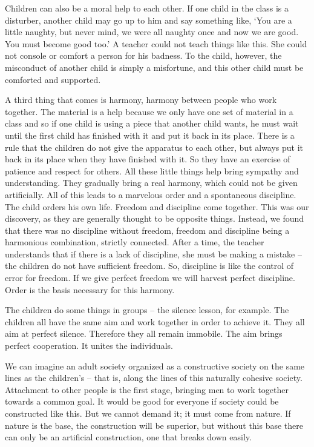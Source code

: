 \documentclass[lang=cn,10pt]{elegantbook}
\begin{document}
Children can also be a moral help to each other. If one child in the class is a disturber, another child may go up to him and say something like, ‘You are a little naughty, but never mind, we were all naughty once and now we are good. You must become good too.’ A teacher could not teach things like this. She could not console or comfort a person for his badness. To the child, however, the misconduct of another child is simply a misfortune, and this other child must be comforted and supported.

A third thing that comes is harmony, harmony between people who work together. The material is a help because we only have one set of material in a class and so if one child is using a piece that another child wants, he must wait until the first child has finished with it and put it back in its place. There is a rule that the children do not give the apparatus to each other, but always put it back in its place when they have finished with it. So they have an exercise of patience and respect for others. All these little things help bring sympathy and understanding. They gradually bring a real harmony, which could not be given artificially. All of this leads to a marvelous order and a spontaneous discipline. The child orders his own life. Freedom and discipline come together. This was our discovery, as they are generally thought to be opposite things. Instead, we found that there was no discipline without freedom, freedom and discipline being a harmonious combination, strictly connected. After a time, the teacher understands that if there is a lack of discipline, she must be making a mistake – the children do not have sufficient freedom. So, discipline is like the control of error for freedom. If we give perfect freedom we will harvest perfect discipline. Order is the basis necessary for this harmony.

The children do some things in groups – the silence lesson, for example. The children all have the same aim and work together in order to achieve it. They all aim at perfect silence. Therefore they all remain immobile. The aim brings perfect cooperation. It unites the individuals.

We can imagine an adult society organized as a constructive society on the same lines as the children’s – that is, along the lines of this naturally cohesive society. Attachment to other people is the first stage, bringing men to work together towards a common goal. It would be good for everyone if society could be constructed like this. But we cannot demand it; it must come from nature. If nature is the base, the construction will be superior, but without this base there can only be an artificial construction, one that breaks down easily.
\end{document}
